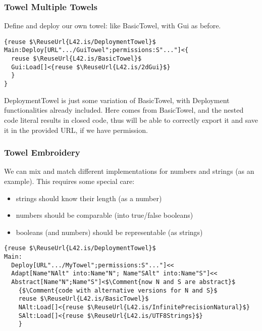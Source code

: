 \begin{frame}[fragile]
\frametitle{Towel Multiple Towels}

Define and deploy our own towel: like BasicTowel, with Gui as before.
\begin{NiceCode}{59ex}{1}
\begin{lstlisting}
{reuse $\ReuseUrl{L42.is/DeploymentTowel}$
Main:Deploy[URL".../GuiTowel";permissions:S"..."]<{
  reuse $\ReuseUrl{L42.is/BasicTowel}$
  Gui:Load[]<{reuse $\ReuseUrl{L42.is/2dGui}$}
  }
}
\end{lstlisting}
\end{NiceCode}
DeploymentTowel is just some variation of BasicTowel, with Deployment
functionalities already included.
Here \Q@Load@ comes from BasicTowel, and the nested code literal
results in closed code, thus \Q@Deploy@ will be able to correctly
export it and save it in the provided URL, if we have permission.

\end{frame}
\begin{frame}[fragile]
\frametitle{Towel Embroidery}
We can mix and match different implementations for numbers and strings (as an example).
This requires some special care:
\begin{itemize}
\item strings should know their length (as a number)
\item numbers should be comparable (into true/false booleans)
\item booleans (and numbers) should be representable (as strings)
\end{itemize}
\begin{NiceCode}{59ex}{0.9}
\begin{lstlisting}
{reuse $\ReuseUrl{L42.is/DeploymentTowel}$
Main:
  Deploy[URL".../MyTowel";permissions:S"..."]<<
  Adapt[Name"NAlt" into:Name"N"; Name"SAlt" into:Name"S"]<<
  Abstract[Name"N";Name"S"]<$\Comment{now N and S are abstract}$
    {$\Comment{code with alternative versions for N and S}$
    reuse $\ReuseUrl{L42.is/BasicTowel}$
    NAlt:Load[]<{reuse $\ReuseUrl{L42.is/InfinitePrecisionNatural}$}
    SAlt:Load[]<{reuse $\ReuseUrl{L42.is/UTF8Strings}$}
    }
\end{lstlisting}
\end{NiceCode}

\end{frame}
